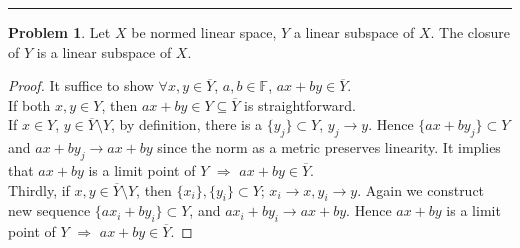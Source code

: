\documentclass[a4paper, 10pt]{article}
\theoremstyle{definition}
\newtheorem{problem}{Problem}
\theoremstyle{hSol}
\begin{document}
\noindent\rule{16cm}{0.4pt}
\begin{problem} Let $X$ be normed linear space, $Y$ a linear subspace of $X$. The closure of $Y$ is a linear subspace of $X$.
\end{problem}
\begin{proof} It suffice to show $\forall x,y\in \overline{Y}$, $a,b\in \mathbb{F}$, $ax+by \in \overline{Y}$. \\
If both $x,y \in Y$, then $ax+by \in Y \subseteq \overline{Y}$ is straightforward. \\
If $x\in Y$, $y\in \overline{Y}\setminus Y$, by definition, there is a $\{y_j\}\subset Y$, $y_j\to y$. Hence $\{ax+by_j\}\subset Y$ and $ax+by_j \to ax+by$ since the norm as a metric preserves linearity. It implies that $ax+by$ is a limit point of $Y$ $\Rightarrow$ $ax+by\in \overline{Y}$. \\
Thirdly, if $x,y \in \overline{Y}\setminus Y$, then $\{x_i\},\{y_i\}\subset Y$; $x_i\to x, y_i\to y$. Again we construct new sequence $\{ax_i+by_i\}\subset Y$, and $ax_i+by_i \to ax+by$. Hence $ax+by$ is a limit point of $Y$ $\Rightarrow$ $ax+by\in \overline{Y}$.
\end{proof} 
\end{document}
